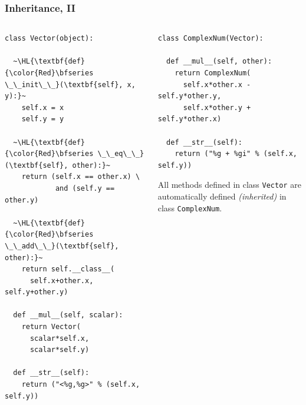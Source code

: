 \documentclass[english,serif,mathserif,xcolor=pdftex,dvipsnames,table]{beamer}
\begin{document}
\begin{frame}[fragile]
  \frametitle{Inheritance, II}

  \begin{columns}[t]
    \begin{column}{0.5\textwidth}
\begin{lstlisting}[basicstyle=\tiny\ttfamily,showstringspaces=false]
class Vector(object):

  ~\HL{\textbf{def} {\color{Red}\bfseries \_\_init\_\_}(\textbf{self}, x, y):}~
    self.x = x
    self.y = y

  ~\HL{\textbf{def} {\color{Red}\bfseries \_\_eq\_\_}(\textbf{self}, other):}~
    return (self.x == other.x) \
            and (self.y == other.y)

  ~\HL{\textbf{def} {\color{Red}\bfseries \_\_add\_\_}(\textbf{self}, other):}~
    return self.__class__(
      self.x+other.x, self.y+other.y)

  def __mul__(self, scalar):
    return Vector(
      scalar*self.x,
      scalar*self.y)

  def __str__(self):
    return ("<%g,%g>" % (self.x, self.y))
\end{lstlisting}
    \end{column}
    \begin{column}{0.5\textwidth}
\begin{lstlisting}[basicstyle=\tiny\ttfamily,showstringspaces=false]
class ComplexNum(Vector):

  def __mul__(self, other):
    return ComplexNum(
      self.x*other.x - self.y*other.y,
      self.x*other.y + self.y*other.x)

  def __str__(self):
    return ("%g + %gi" % (self.x, self.y))
\end{lstlisting}

      \+
  All methods defined in class \texttt{Vector} are automatically
  defined \emph{(inherited)} in class \texttt{ComplexNum}.
    \end{column}
  \end{columns}
\end{frame}
\end{document}
